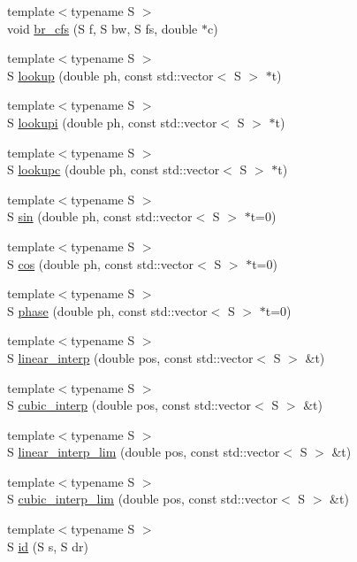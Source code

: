 \begin{DoxyCompactItemize}
\item 
{\footnotesize template$<$typename S $>$ }\\void \hyperlink{namespace_aurora_afe0c9010d177c5be0aa923601d802111}{br\+\_\+cfs} (S f, S bw, S fs, double $\ast$c)
\item 
{\footnotesize template$<$typename S $>$ }\\S \hyperlink{namespace_aurora_ae0082f7bc3946a88145d54bacd0c6ff3}{lookup} (double ph, const std\+::vector$<$ S $>$ $\ast$t)
\item 
{\footnotesize template$<$typename S $>$ }\\S \hyperlink{namespace_aurora_a9246ac499667da52a0d1750e5238c4a8}{lookupi} (double ph, const std\+::vector$<$ S $>$ $\ast$t)
\item 
{\footnotesize template$<$typename S $>$ }\\S \hyperlink{namespace_aurora_afab81d7b8873e7850073124fcf37eeea}{lookupc} (double ph, const std\+::vector$<$ S $>$ $\ast$t)
\item 
{\footnotesize template$<$typename S $>$ }\\S \hyperlink{namespace_aurora_a76909b8c5d5801213d35fffa69499885}{sin} (double ph, const std\+::vector$<$ S $>$ $\ast$t=0)
\item 
{\footnotesize template$<$typename S $>$ }\\S \hyperlink{namespace_aurora_a0269c3758ab62d6a910cd8f7ace7fba2}{cos} (double ph, const std\+::vector$<$ S $>$ $\ast$t=0)
\item 
{\footnotesize template$<$typename S $>$ }\\S \hyperlink{namespace_aurora_a6a6af5d9695d0ec8fcb343c456c1faab}{phase} (double ph, const std\+::vector$<$ S $>$ $\ast$t=0)
\item 
{\footnotesize template$<$typename S $>$ }\\S \hyperlink{namespace_aurora_acdc5f35b9cbf54f7fc84a423d76bd488}{linear\+\_\+interp} (double pos, const std\+::vector$<$ S $>$ \&t)
\item 
{\footnotesize template$<$typename S $>$ }\\S \hyperlink{namespace_aurora_a35b9cf383290bddedd82b7c3d0f05e81}{cubic\+\_\+interp} (double pos, const std\+::vector$<$ S $>$ \&t)
\item 
{\footnotesize template$<$typename S $>$ }\\S \hyperlink{namespace_aurora_af38f1e4b1a40dab35331f0a2be969091}{linear\+\_\+interp\+\_\+lim} (double pos, const std\+::vector$<$ S $>$ \&t)
\item 
{\footnotesize template$<$typename S $>$ }\\S \hyperlink{namespace_aurora_af2e17b2dd2a65b4a036a4106cd71ae0a}{cubic\+\_\+interp\+\_\+lim} (double pos, const std\+::vector$<$ S $>$ \&t)
\item 
{\footnotesize template$<$typename S $>$ }\\S \hyperlink{namespace_aurora_aca47d4c2fcfc307c85418fe7a0b1e98e}{id} (S s, S dr)
\end{DoxyCompactItemize}
